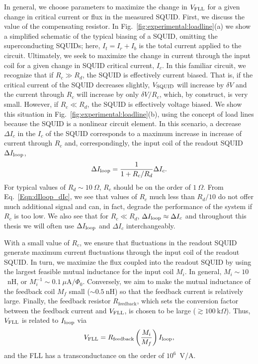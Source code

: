 In general, we choose parameters to maximize the change in $V_\text{FLL}$ for a given change in critical current or flux in the measured SQUID. First, we discuss the value of the compensating resistor. In Fig.~\ref{fig:experimental:loadline}(a) we show a simplified schematic of the typical biasing of a SQUID, omitting the superconducting SQUIDs; here, $I_t = I_r + I_b$ is the total current applied to the circuit. Ultimately, we seek to maximize the change in current through the input coil for a given change in SQUID critical current, $I_c$. In this familiar circuit, we recognize that if $R_c \gg R_d$, the SQUID is effectively current biased. That is, if the critical current of the SQUID decreases slightly, $V_\text{SQUID}$ will increase by $\delta V$ and the current through $R_c$ will increase by only $\delta V/R_c$, which, by construct, is very small. However, if $R_c \ll R_d$, the SQUID is effectively voltage biased. We show this situation in Fig.~\ref{fig:experimental:loadline}(b), using the concept of load lines because the SQUID is a nonlinear circuit element. In this scenario, a decrease $\Delta I_c$ in the $I_c$ of the SQUID corresponds to a maximum increase in increase of current through $R_c$ and, correspondingly, the input coil of the readout SQUID $\Delta I_\text{loop}$,
\begin{align}\label{Eqn:dIloop_dIc}
\Delta I_\text{loop} = \frac{1}{1+R_c/R_d} \Delta I_c.
\end{align}
For typical values of $R_d \sim 10~\Omega$, $R_c$ should be on the order of $1~\Omega$. From Eq.~\eqref{Eqn:dIloop_dIc}, we see that values of $R_c$ much less than $R_d/10$ do not offer much additional signal and can, in fact, degrade the performance of the system if $R_c$ is too low. We also see that for $R_c \ll R_d$, $\Delta I_\text{loop} \approx \Delta I_c$ and throughout this thesis we will often use $\Delta I_\text{loop}$ and $\Delta I_c$ interchangeably.

With a small value of $R_c$, we ensure that fluctuations in the readout SQUID generate maximum current fluctuations through the input coil of the readout SQUID. In turn, we maximize the flux coupled into the readout SQUID by using the largest feasible mutual inductance for the input coil $M_i$. In general, $M_i \sim 10$~nH, or $M_i^{-1} \sim 0.1~\mu\text{A}/\Phi_0$. Conversely, we aim to make the mutual inductance of the feedback coil $M_f$ small ($\sim 0.5~$nH) so that the feedback current is relatively large. Finally, the feedback resistor $R_{\text{feedback}}$, which sets the conversion factor between the feedback current and $V_\text{FLL}$, is chosen to be large ($\gtrsim 100~\text{k}\Omega$). Thus, $V_\text{FLL}$ is related to $I_\text{loop}$ via
\begin{align}\label{fig:experimental:Vfll_Iloop}
V_\text{FLL} = R_{\text{feedback}} \left( \frac{M_i}{M_f} \right)I_\text{loop},
\end{align}
and the FLL has a transconductance on the order of $10^6$~V/A.


